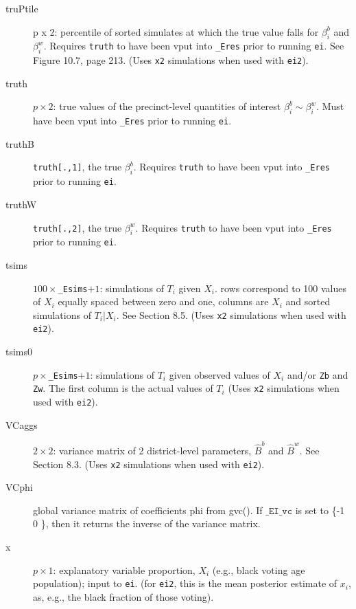 \documentclass[11pt,titlepage]{article}
\begin{document}
\begin{description}
\item[truPtile] p x 2: percentile of sorted simulates at which the
  true value falls for $\beta_i^b$ and $\beta_i^w$.  Requires
  \texttt{truth} to have been vput into \texttt{\_Eres} prior to
  running \texttt{ei}. See Figure 10.7, page 213.  (Uses \texttt{x2}
  simulations when used with \texttt{ei2}).

\item[truth] $p\times 2$: true values of the precinct-level quantities
  of interest $\beta_i^b\sim\beta_i^w$.  Must have been vput into
  \texttt{\_Eres} prior to running \texttt{ei}.

\item[truthB] \texttt{truth[.,1]}, the true $\beta_i^b$.  Requires
  \texttt{truth} to have been vput into \texttt{\_Eres} prior to
  running \texttt{ei}.

\item[truthW] \texttt{truth[.,2]}, the true $\beta_i^w$.  Requires
  \texttt{truth} to have been vput into \texttt{\_Eres} prior to
  running \texttt{ei}.

\item[tsims] $100\times$\texttt{\_Esims}$+1$: simulations of $T_i$
  given $X_i$.  rows correspond to 100 values of $X_i$ equally spaced
  between zero and one, columns are $X_i$ and sorted simulations of
  $T_i|X_i$.  See Section 8.5.  (Uses \texttt{x2} simulations when
  used with \texttt{ei2}).
  
\item[tsims0] $p\times$\texttt{\_Esims}$+1$: simulations of $T_i$
  given observed values of $X_i$ and/or \texttt{Zb} and \texttt{Zw}.
  The first column is the actual values of $T_i$ (Uses \texttt{x2}
  simulations when used with \texttt{ei2}).

\item[VCaggs] $2\times 2$: variance matrix of 2 district-level
  parameters, $\hat{B}^b$ and $\hat{B}^w$.  See Section 8.3.  (Uses
  \texttt{x2} simulations when used with \texttt{ei2}).

\item[VCphi] global variance matrix of coefficients phi from gvc(). If
  $\texttt{\_EI\_vc}$ is set to \{-1 0 \}, then it returns the inverse of
  the variance matrix. 

\item[x] $p\times 1$: explanatory variable proportion, $X_i$ (e.g.,
  black voting age population); input to \texttt{ei}.  (for
  \texttt{ei2}, this is the mean posterior estimate of $x_i$, as,
  e.g., the black fraction of those voting).


\end{description}
\end{document}
